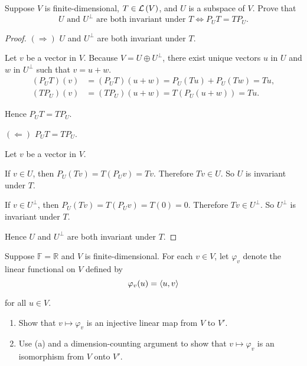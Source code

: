 \begin{exercise}\label{chapter6:sectionC:exercise12}
    Suppose $V$ is finite-dimensional, $T \in \mathcal{L}\left({V}\right)$, and $U$ is a subspace of $V$. Prove that
    \[
        \text{$U$ and $U^{\bot}$ are both invariant under $T$} \Longleftrightarrow P_{U}T = TP_{U}.
    \]
\end{exercise}

\begin{proof}
    $(\Rightarrow)$ $U$ and $U^{\bot}$ are both invariant under $T$.

    Let $v$ be a vector in $V$. Because $V = U\oplus U^{\bot}$, there exist unique vectors $u$ in $U$ and $w$ in $U^{\bot}$ such that $v = u + w$.
    \begin{align*}
        (P_{U}T)(v) & = (P_{U}T)(u + w) = P_{U}(Tu) + P_{U}(Tw) = Tu, \\
        (TP_{U})(v) & = (TP_{U})(u + w) = T(P_{U}(u + w)) = Tu.
    \end{align*}

    Hence $P_{U}T = TP_{U}$.

    \bigskip

    $(\Leftarrow)$ $P_{U}T = TP_{U}$.

    Let $v$ be a vector in $V$.

    If $v\in U$, then $P_{U}(Tv) = T(P_{U}v) = Tv$. Therefore $Tv\in U$. So $U$ is invariant under $T$.

    If $v\in U^{\bot}$, then $P_{U}(Tv) = T(P_{U}v) = T(0) = 0$. Therefore $Tv\in U^{\bot}$. So $U^{\bot}$ is invariant under $T$.

    Hence $U$ and $U^{\bot}$ are both invariant under $T$.
\end{proof}
\newpage

\begin{exercise}
    Suppose $\mathbb{F} = \mathbb{R}$ and $V$ is finite-dimensional. For each $v \in V$, let $\varphi_{v}$ denote the linear functional on $V$ defined by
    \[
        \varphi_{v}(u) = \left\langle{u, v}\right\rangle
    \]

    for all $u\in V$.
    \begin{enumerate}[label={(\alph*)}]
        \item Show that $v\mapsto \varphi_{v}$ is an injective linear map from $V$ to $V'$.
        \item Use (a) and a dimension-counting argument to show that $v\mapsto \varphi_{v}$ is an isomorphism from $V$ onto $V'$.
    \end{enumerate}
\end{exercise}

